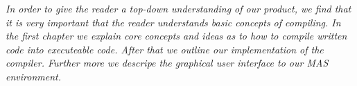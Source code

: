 \textit{In order to give the reader a top-down understanding of our product, we find that it is very important that the reader understands basic concepts of compiling. In the first chapter we explain core concepts and ideas as to how to compile written code into executeable code. After that we outline our implementation of the compiler. Further more we descripe the graphical user interface to our MAS environment.}\\ \\